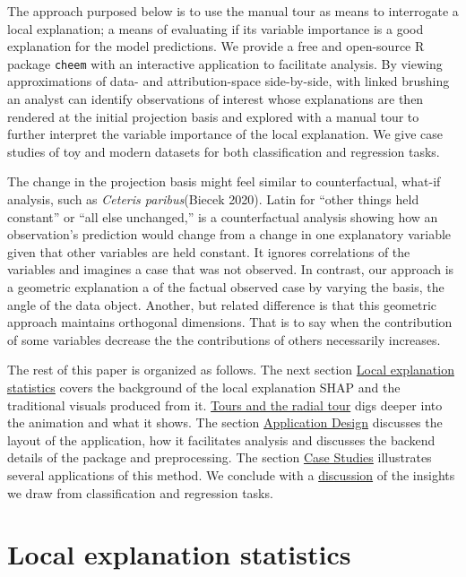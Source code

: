 \documentclass[
]{article}
\begin{document}
The approach purposed below is to use the manual tour as means to interrogate a local explanation; a means of evaluating if its variable importance is a good explanation for the model predictions. We provide a free and open-source R package \texttt{cheem} with an interactive application to facilitate analysis. By viewing approximations of data- and attribution-space side-by-side, with linked brushing an analyst can identify observations of interest whose explanations are then rendered at the initial projection basis and explored with a manual tour to further interpret the variable importance of the local explanation. We give case studies of toy and modern datasets for both classification and regression tasks.

The change in the projection basis might feel similar to counterfactual, what-if analysis, such as \emph{Ceteris paribus}(Biecek 2020). Latin for ``other things held constant'' or ``all else unchanged,'' is a counterfactual analysis showing how an observation's prediction would change from a change in one explanatory variable given that other variables are held constant. It ignores correlations of the variables and imagines a case that was not observed. In contrast, our approach is a geometric explanation a of the factual observed case by varying the basis, the angle of the data object. Another, but related difference is that this geometric approach maintains orthogonal dimensions. That is to say when the contribution of some variables decrease the the contributions of others necessarily increases.

The rest of this paper is organized as follows. The next section \protect\hyperlink{sec:explanations}{Local explanation statistics} covers the background of the local explanation SHAP and the traditional visuals produced from it. \protect\hyperlink{sec:tour}{Tours and the radial tour} digs deeper into the animation and what it shows. The section \protect\hyperlink{sec:applicationdesign}{Application Design} discusses the layout of the application, how it facilitates analysis and discusses the backend details of the package and preprocessing. The section \protect\hyperlink{sec:casestudies}{Case Studies} illustrates several applications of this method. We conclude with a \protect\hyperlink{sec:discussion}{discussion} of the insights we draw from classification and regression tasks.

\hypertarget{sec:explanations}{%
\section{Local explanation statistics}\label{sec:explanations}}
\end{document}
